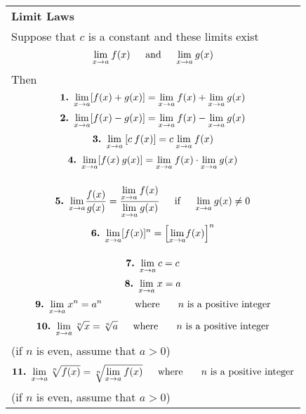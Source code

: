 \documentclass[fleqn]{article}
\begin{document}
\begin{center}
\large
\def\arraystretch{1.3}
{\setlength{\tabcolsep}{16pt}
\begin{tabularx}{.9\textwidth}{|X|}
\hline
	\vspace{1pt}
	\textbf{Limit Laws} \\
	Suppose that $c$ is a constant and these limits exist
	$$\underset{x \to a}{\lim} \: f(x) \text{\hspace{12pt} and \hspace{12pt}} \underset{x \to a}{\lim} \: g(x)$$
	Then
	\[\text{\textbf{1. }} \underset{x \to a}{\lim} [f(x) + g(x)] = \underset{x \to a}{\lim} \: f(x) + \underset{x \to a}{\lim} \: g(x)\]
	\[\text{\textbf{2. }} \underset{x \to a}{\lim} [f(x) - g(x)] = \underset{x \to a}{\lim} \: f(x) - \underset{x \to a}{\lim} \: g(x)\] 
	\[\text{\textbf{3. }} \underset{x \to a}{\lim} \: [c \: f(x)] = c \: \underset{x \to a}{\lim} \: f(x) \] 
	\[\text{\textbf{4. }} \underset{x \to a}{\lim} [f(x) \: g(x)] = \underset{x \to a}{\lim} \: f(x) \cdot \underset{x \to a}{\lim} \: g(x)\] \\[-32pt] 
	\[\text{\textbf{5. }} \underset{x \to a}{\lim} \dfrac{f(x)}{g(x)} = \dfrac{\underset{x \to a}{\lim} \: f(x)}{\underset{x \to a}{\lim} \: g(x)} \text{\hspace{12pt} if \hspace{12pt}} \underset{x \to a}{\lim} \: g(x) \ne 0 \] 
	\[\text{\textbf{6. }} \underset{x \to a}{\lim} [f(x)]^n = \Big[\underset{x \to a}{\lim} f(x) \Big]^n \] \\[-32pt]
	\[\text{\textbf{7. }} \underset{x \to a}{\lim} \: c = c \] 
	\[\text{\textbf{8. }} \underset{x \to a}{\lim} \: x = a \] 
	\[\text{\textbf{9. }} \underset{x \to a}{\lim} \: x^n = a^n \text{\hspace{30pt} where \hspace{12pt} $n$ is a positive integer}\] 
	\[\text{\textbf{10. }} \underset{x \to a}{\lim} \: \sqrt[n]{x} = \sqrt[n]{a} \text{\hspace{12pt} where \hspace{12pt} $n$ is a positive integer}\] 
	\hspace{135pt}(if $n$ is even, assume that $a > 0$)
	\[\text{\textbf{11. }} \underset{x \to a}{\lim} \: \sqrt[n]{f(x)} = \sqrt[n]{\underset{x \to a}{\lim} \: f(x)} \text{\hspace{12pt} where \hspace{12pt} $n$ is a positive integer}\] 
	\hspace{195pt}(if $n$ is even, assume that $a > 0$) \\
\hline
\end{tabularx}}
\vspace{12pt}


\end{center}
\end{document}
